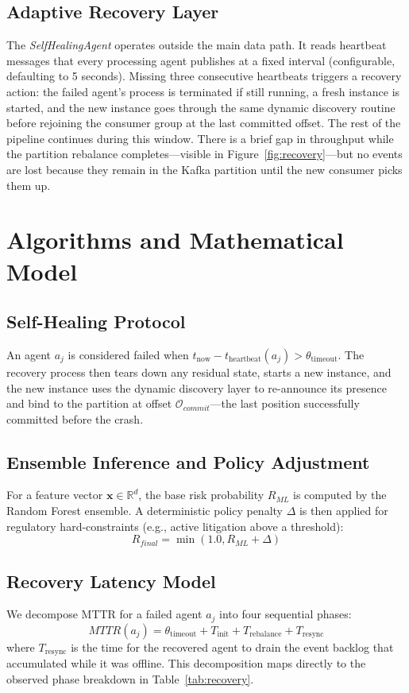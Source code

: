\documentclass[runningheads]{llncs}
\begin{document}
\subsection{Adaptive Recovery Layer}
The \textit{SelfHealingAgent} operates outside the main data path. It reads heartbeat messages that every processing agent publishes at a fixed interval (configurable, defaulting to 5 seconds). Missing three consecutive heartbeats triggers a recovery action: the failed agent's process is terminated if still running, a fresh instance is started, and the new instance goes through the same dynamic discovery routine before rejoining the consumer group at the last committed offset. The rest of the pipeline continues during this window. There is a brief gap in throughput while the partition rebalance completes---visible in Figure~\ref{fig:recovery}---but no events are lost because they remain in the Kafka partition until the new consumer picks them up.

\section{Algorithms and Mathematical Model}

\subsection{Self-Healing Protocol}
An agent $a_j$ is considered failed when $t_{\text{now}} - t_{\text{heartbeat}}(a_j) > \theta_{\text{timeout}}$. The recovery process then tears down any residual state, starts a new instance, and the new instance uses the dynamic discovery layer to re-announce its presence and bind to the partition at offset $\mathcal{O}_{commit}$---the last position successfully committed before the crash.

\subsection{Ensemble Inference and Policy Adjustment}
For a feature vector $\mathbf{x} \in \mathbb{R}^d$, the base risk probability $R_{ML}$ is computed by the Random Forest ensemble. A deterministic policy penalty $\Delta$ is then applied for regulatory hard-constraints (e.g., active litigation above a threshold):
\begin{equation}
R_{final} = \min(1.0, R_{ML} + \Delta)
\end{equation}

\subsection{Recovery Latency Model}
We decompose MTTR for a failed agent $a_j$ into four sequential phases:
\begin{equation}
MTTR(a_j) = \theta_{\text{timeout}} + T_{\text{init}} + T_{\text{rebalance}} + T_{\text{resync}}
\end{equation}
where $T_{\text{resync}}$ is the time for the recovered agent to drain the event backlog that accumulated while it was offline. This decomposition maps directly to the observed phase breakdown in Table~\ref{tab:recovery}.
\end{document}
